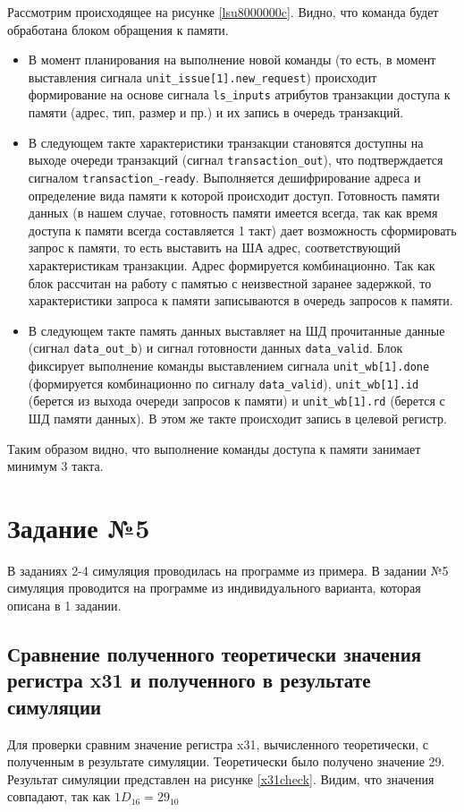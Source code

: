 \documentclass[12pt]{report}
\begin{document}
Рассмотрим происходящее на рисунке \ref{lsu8000000c}. Видно, что команда будет обработана блоком обращения к памяти.
\begin{itemize}
\item В момент планирования на выполнение новой команды (то есть, в момент выставления сигнала \verb|unit_issue[1].new_request|) происходит формирование на основе сигнала \verb|ls_inputs| атрибутов транзакции доступа к памяти (адрес, тип, размер и пр.) и их запись в очередь транзакций.
\item В следующем такте характеристики транзакции становятся доступны на выходе очереди транзакций (сигнал \verb|transaction_out|), что подтверждается сигналом \verb|transaction_|-\verb|ready|. Выполняется дешифрирование адреса и определение вида памяти к которой происходит доступ. Готовность памяти данных (в нашем случае, готовность памяти имеется всегда, так как время доступа к памяти всегда составляется 1 такт) дает возможность сформировать запрос к памяти, то есть выставить на ША адрес, соответствующий характеристикам транзакции. Адрес формируется комбинационно. Так как блок рассчитан на работу с памятью с неизвестной заранее задержкой, то характеристики запроса к памяти записываются в очередь запросов к памяти.
\item В следующем такте память данных выставляет на ШД прочитанные данные (сигнал \verb|data_out_b|) и сигнал готовности данных \verb|data_valid|. Блок фиксирует выполнение команды выставлением сигнала \verb|unit_wb[1].done| (формируется комбинационно по сигналу \verb|data_valid|), \verb|unit_wb[1].id| (берется из выхода очереди запросов к памяти) и \verb|unit_wb[1].rd| (берется с ШД памяти данных). В этом же такте происходит запись в целевой регистр. 
\end{itemize}

Таким образом видно, что выполнение команды доступа к памяти занимает минимум 3 такта.

\chapter{Задание №5}
В заданиях 2-4 симуляция проводилась на программе из примера. В задании №5 симуляция проводится на программе из индивидуального варианта, которая описана в 1 задании. 

\section{Сравнение полученного теоретически значения регистра x31 и полученного в результате симуляции}
Для проверки сравним значение регистра x31, вычисленного теоретически, с полученным в результате симуляции. Теоретически было получено значение 29. Результат симуляции представлен на рисунке \ref{x31check}. Видим, что значения совпадают, так как ${1D}_{16} = {29}_{10}$
\end{document}
